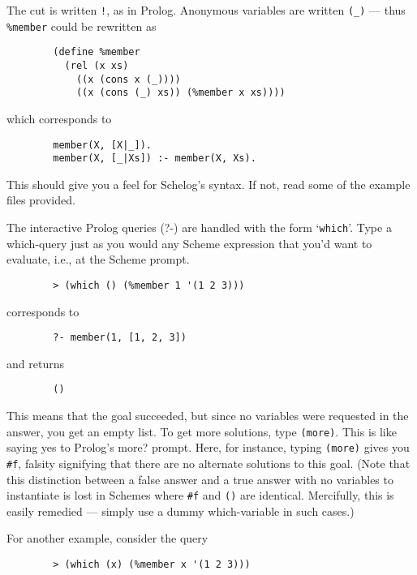 \medskip
\par
The cut is written \verb+!+, as in Prolog.  Anonymous variables are
written \verb+(_)+ --- thus \verb+%member+ could be rewritten as
\medskip
{\baselineskip=10pt
\begin{verbatim}
        (define %member
          (rel (x xs)
            ((x (cons x (_))))
            ((x (cons (_) xs)) (%member x xs))))
\end{verbatim}}
\medskip
\par
which corresponds to
\medskip
{\baselineskip=10pt
\begin{verbatim}
        member(X, [X|_]).
        member(X, [_|Xs]) :- member(X, Xs).
\end{verbatim}}
\medskip
\par
This should give you a feel for Schelog's syntax.  If not,
read some of the example files provided.
\medskip
\par
The interactive Prolog queries (?-) are handled with the
form `\verb+which+'.  Type a which-query just as you would any
Scheme expression that you'd want to evaluate, i.e., at the
Scheme prompt.
\medskip
{\baselineskip=10pt
\begin{verbatim}
        > (which () (%member 1 '(1 2 3)))
\end{verbatim}}
\medskip
\par
corresponds to
\medskip
{\baselineskip=10pt
\begin{verbatim}
        ?- member(1, [1, 2, 3])
\end{verbatim}}
\medskip
\par
and returns
\medskip
{\baselineskip=10pt
\begin{verbatim}
        ()
\end{verbatim}}
\medskip
\par
This means that the goal succeeded, but since no variables
were requested in the answer, you get an empty list.  To get
more solutions, type \verb+(more)+.  This is like saying yes to
Prolog's more? prompt.  Here, for instance, typing \verb+(more)+
gives you \verb+#f+, falsity signifying that there are no alternate
solutions to this goal.  (Note that this distinction between
a false answer and a true answer with no variables to
instantiate is lost in Schemes where \verb+#f+ and \verb+()+ are
identical.  Mercifully, this is easily remedied --- simply
use a dummy which-variable in such cases.)
\medskip
\par
For another example, consider the query
\medskip
{\baselineskip=10pt
\begin{verbatim}
        > (which (x) (%member x '(1 2 3)))
\end{verbatim}}
